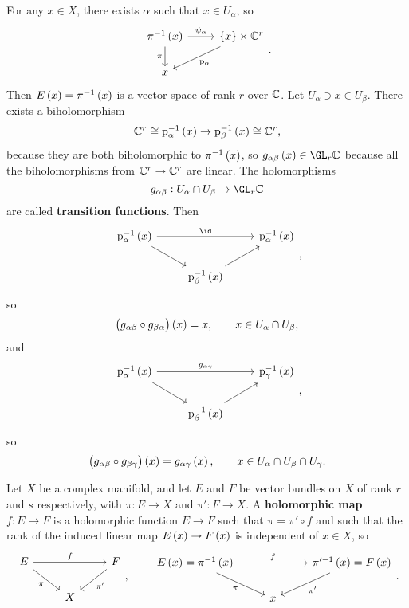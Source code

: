For any $ x \in X $, there exists $ \alpha $ such that $ x \in U_\alpha $, so
$$
\begin{tikzcd}
\pi^{-1}\br{x} \arrow{r}{\psi_\alpha} \arrow[swap]{d}{\pi} & \cbr{x} \times \CC^r \arrow{dl}{\p_\alpha} \\
x &
\end{tikzcd}.
$$
Then $ E\br{x} = \pi^{-1}\br{x} $ is a vector space of rank $ r $ over $ \mathbb{C} $. Let $ U_\alpha \ni x \in U_\beta $. There exists a biholomorphism
$$ \CC^r \cong \p_\alpha^{-1}\br{x} \to \p_\beta^{-1}\br{x} \cong \CC^r, $$
because they are both biholomorphic to $ \pi^{-1}\br{x} $, so $ g_{\alpha\beta}\br{x} \in \GL_r \CC $ because all the biholomorphisms from $ \mathbb{C}^r \to \mathbb{C}^r $ are linear. The holomorphisms
$$ g_{\alpha\beta} : U_\alpha \cap U_\beta \to \GL_r \CC $$
are called \textbf{transition functions}. Then
$$
\begin{tikzcd}
\p_\alpha^{-1}\br{x} \arrow{rr}{\id} \arrow{dr} & & \p_\alpha^{-1}\br{x} \\
& \p_\beta^{-1}\br{x} \arrow{ur} &
\end{tikzcd},
$$
so
$$ \br{g_{\alpha\beta} \circ g_{\beta\alpha}}\br{x} = x, \qquad x \in U_\alpha \cap U_\beta, $$
and
$$
\begin{tikzcd}
\p_\alpha^{-1}\br{x} \arrow{rr}{g_{\alpha\gamma}} \arrow{dr} & & \p_\gamma^{-1}\br{x} \\
& \p_\beta^{-1}\br{x} \arrow{ur} &
\end{tikzcd},
$$
so
$$ \br{g_{\alpha\beta} \circ g_{\beta\gamma}}\br{x} = g_{\alpha\gamma}\br{x}, \qquad x \in U_\alpha \cap U_\beta \cap U_\gamma. $$

\begin{definition}
Let $ X $ be a complex manifold, and let $ E $ and $ F $ be vector bundles on $ X $ of rank $ r $ and $ s $ respectively, with $ \pi : E \to X $ and $ \pi' : F \to X $. A \textbf{holomorphic map} $ f : E \to F $ is a holomorphic function $ E \to F $ such that $ \pi = \pi' \circ f $ and such that the rank of the induced linear map $ E\br{x} \to F\br{x} $ is independent of $ x \in X $, so
$$
\begin{tikzcd}
E \arrow{rr}{f} \arrow[swap]{dr}{\pi} & & F \arrow{dl}{\pi'} \\
& X &
\end{tikzcd},
\qquad
\begin{tikzcd}
E\br{x} = \pi^{-1}\br{x} \arrow{rr}{f} \arrow[swap]{dr}{\pi} & & \pi'^{-1}\br{x} = F\br{x} \arrow{dl}{\pi'} \\
& x &
\end{tikzcd}.
$$
\end{definition}


